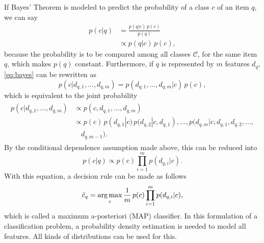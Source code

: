 If Bayes' Theorem is modeled to predict the probability of a class $c$ of an item $q$, we can say
\begin{align}
    \label{eq:bayes}
    p(c|q)      &= \frac{p(q|c)\,p(c)}{p(q)}\\
                &\propto p(q|c)\,p(c),
\end{align}
because the probability is to be compared among all classes $\mathcal{C}$, for the same item $q$, which makes $p(q)$ constant. Furthermore, if $q$ is represented by $m$ features $d_q$, \eqref{eq:bayes} can be rewritten as
\begin{equation}
    p(c|d_{q,1},\dotsc,d_{q,m}) = p(d_{q,1}, \dotsc,d_{q,m}|c)\,p(c),
\end{equation}
which is equivalent to the joint probability
\begin{align}\begin{split}
    p(c|d_{q,1},\dotsc,d_{q,m}) &\propto p(c,d_{q,1}, \dotsc,d_{q,m})\\
        &\propto p(c)\,p(d_{q,1}|c)\, p(d_{q,2}|c,d_{q,1}), \dotsc,p(d_{q,m}|c,d_{q,1},d_{q,2},\dotsc,\\&\quad d_{q,m-1}).
    \end{split} 
\end{align}
By the conditional dependence assumption made above, this can be reduced into
\begin{equation}
    p(c|q) \propto p(c)\prod_{i=1}^m p(d_{q,i}|c).
\end{equation}
With this equation, a decision rule can be made as follows
\begin{equation} \label{eq:map}
    \hat c_q = \operatorname*{arg\,max}_c \frac{1}{m}\,p(c)\prod_{i=1}^m p(d_{q,i}|c),
\end{equation}
which is called a maximum a-posteriori (MAP) classifier. In this formulation of a classification problem, a probability density estimation is needed to model all features. All kinds of distributions can be used for this.

